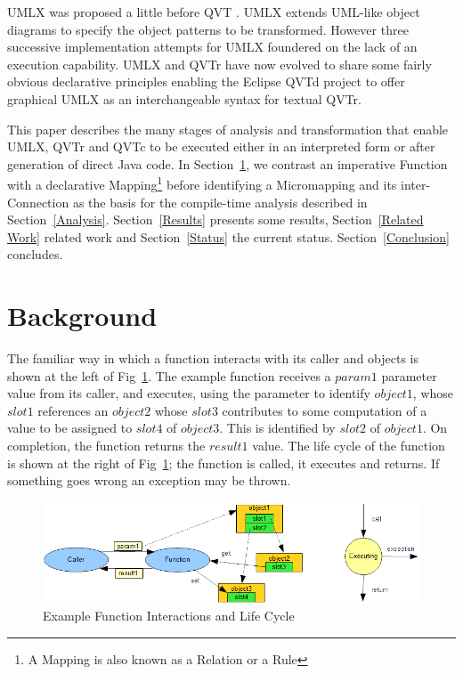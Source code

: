 \documentclass{llncs}
\begin{document}
UMLX \cite{UMLX} was proposed a little before QVT \cite{QVT-1.0}. UMLX extends UML-like object diagrams to specify the object patterns to be transformed. However three successive implementation attempts for UMLX foundered on the lack of an execution capability. UMLX and QVTr have now evolved to share some fairly obvious declarative principles enabling the Eclipse QVTd project to offer graphical UMLX as an interchangeable syntax for textual QVTr.

This paper describes the many stages of analysis and transformation that enable UMLX, QVTr and QVTc to be executed either in an interpreted form or after generation of direct Java code. In Section~\ref{Background}, we contrast an imperative Function with a declarative Mapping\footnote{A Mapping is also known as a Relation or a Rule} before identifying a Micromapping and its inter-Connection as the basis for the compile-time analysis described in Section~\ref{Analysis}. Section~\ref{Results} presents some results, Section~\ref{Related Work} related work and Section~\ref{Status} the current status. Section~\ref{Conclusion} concludes.

\section{Background}\label{Background}

The familiar way in which a function interacts with its caller and objects is shown at the left of Fig~\ref{fig:FunctionContext}. The example function receives a $param1$ parameter value from its caller, and executes, using the parameter to identify $object1$, whose $slot1$ references an $object2$ whose $slot3$ contributes to some computation of a value to be assigned to $slot4$ of $object3$. This is identified by $slot2$ of $object1$. On completion, the function returns the $result1$ value. The life cycle of the function is shown at the right of Fig~\ref{fig:FunctionContext}; the function is called, it executes and returns. If something goes wrong an exception may be thrown.

\begin{figure}
  \begin{center}
    \includegraphics[width=4.5in]{FunctionContext.png}
  \end{center}
  \caption{Example Function Interactions and Life Cycle}
  \label{fig:FunctionContext}
\end{figure}
\end{document}
